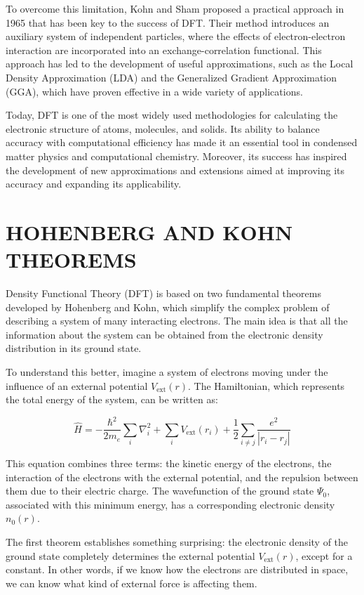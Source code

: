 \documentclass[%
 preprint, linenumbers,
 amsmath,amssymb,
 aps, physrev,
]{revtex4-2}
\begin{document}
To overcome this limitation, Kohn and Sham proposed a practical approach in 1965 that has been key to the success of DFT. Their method introduces an auxiliary system of independent particles, where the effects of electron-electron interaction are incorporated into an exchange-correlation functional. This approach has led to the development of useful approximations, such as the Local Density Approximation (LDA) and the Generalized Gradient Approximation (GGA), which have proven effective in a wide variety of applications.

Today, DFT is one of the most widely used methodologies for calculating the electronic structure of atoms, molecules, and solids. Its ability to balance accuracy with computational efficiency has made it an essential tool in condensed matter physics and computational chemistry. Moreover, its success has inspired the development of new approximations and extensions aimed at improving its accuracy and expanding its applicability.
\section{\label{sec:level1}HOHENBERG AND KOHN THEOREMS }

Density Functional Theory (DFT) is based on two fundamental theorems developed by Hohenberg and Kohn, which simplify the complex problem of describing a system of many interacting electrons. The main idea is that all the information about the system can be obtained from the electronic density distribution in its ground state.

To understand this better, imagine a system of electrons moving under the influence of an external potential \( V_{\text{ext}}(r) \). The Hamiltonian, which represents the total energy of the system, can be written as:

\begin{equation}
\hat{H} = -\frac{\hbar^2}{2m_e} \sum_i \nabla_i^2 + \sum_i V_{\text{ext}}(r_i) + \frac{1}{2} \sum_{i \neq j} \frac{e^2}{|r_i - r_j|}
\end{equation}

This equation combines three terms: the kinetic energy of the electrons, the interaction of the electrons with the external potential, and the repulsion between them due to their electric charge. The wavefunction of the ground state \( \Psi_0 \), associated with this minimum energy, has a corresponding electronic density \( n_0(r) \).

The first theorem establishes something surprising: the electronic density of the ground state completely determines the external potential \( V_{\text{ext}}(r) \), except for a constant. In other words, if we know how the electrons are distributed in space, we can know what kind of external force is affecting them.
\end{document}
